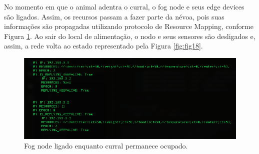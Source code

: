 \documentclass[portuguese,oneside]{tcc}
\begin{document}
No momento em que o animal adentra o curral, o fog node e seus edge devices são ligados.
Assim, os recursos passam a fazer parte da névoa, pois suas informações são propagadas utilizando protocolo de Resource Mapping, conforme Figura \ref{fig:fig19}.
Ao sair do local de alimentação, o nodo e seus sensores são desligados e, assim, a rede volta ao estado representado pela Figura \ref{fig:fig18}.

\begin{figure}[H]
  \centering\includegraphics[width=.9\textwidth]{fig19.png}
  \caption [Fog node ligado enquanto curral permanece ocupado]
  {\label{fig:fig19} Fog node ligado enquanto curral permanece ocupado.}
\end{figure}

  
\end{document}
